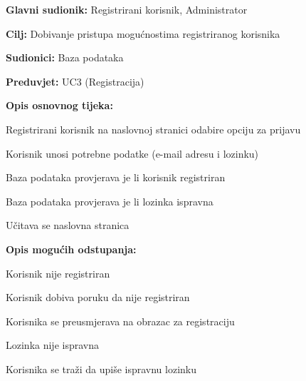 					\noindent {}
					\begin{packed_item}
						
						\item \textbf{Glavni sudionik: }Registrirani korisnik, Administrator
						\item \textbf{Cilj: }Dobivanje pristupa mogućnostima registriranog korisnika
						\item \textbf{Sudionici: }Baza podataka
						\item \textbf{Preduvjet: }UC3 (Registracija)
						\item \textbf{Opis osnovnog tijeka:}
						
						\item[] \begin{packed_enum}
							\item Registrirani korisnik na naslovnoj stranici odabire opciju za prijavu
							\item Korisnik unosi potrebne podatke (e-mail adresu i lozinku)
							\item Baza podataka provjerava je li korisnik registriran
							\item Baza podataka provjerava je li lozinka ispravna
							\item Učitava se naslovna stranica
						\end{packed_enum}
						\item \textbf{Opis mogućih odstupanja:}
						\item[] \begin{packed_enum}
							\item[3.a] Korisnik nije registriran
							\begin{packed_enum}
								\item[1.] Korisnik dobiva poruku da nije registriran
								\item[2.] Korisnika se preusmjerava na obrazac za registraciju
							\end{packed_enum}
							\item[4.a] Lozinka nije ispravna
							\begin{packed_enum}
								\item[1.] Korisnika se traži da upiše ispravnu lozinku
							\end{packed_enum}
						\end{packed_enum}
					\end{packed_item}

